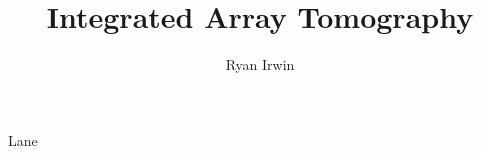 \documentclass{thesis}
\begin{document}
\newcommand{\needref}{[\textit{\textcolor{orange}{references}}]}


\title[Development and Applications of a Workflow for 3D Correlative Light and Electron Microscopy]{Integrated Array Tomography}
\author{Ryan Irwin}{Lane}


\frontmatter  %

\tableofcontents


\mainmatter  %


% 
\end{document}
